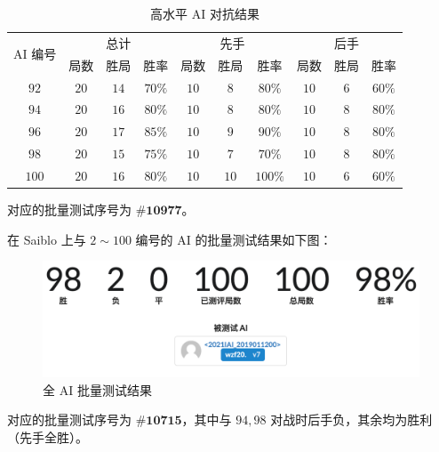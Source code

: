 \documentclass[a4paper]{article}
\begin{document}
    \begin{table}[H]
        \centering
        \begin{tabular}{cccccccccc}
            \toprule
            \multirow{2}{*}{AI 编号} & \multicolumn{3}{c}{总计} & \multicolumn{3}{c}{先手} & \multicolumn{3}{c}{后手} \\
            & \multicolumn{1}{c}{局数} & \multicolumn{1}{c}{胜局} & \multicolumn{1}{c}{胜率} & \multicolumn{1}{c}{局数} & \multicolumn{1}{c}{胜局} & \multicolumn{1}{c}{胜率} & \multicolumn{1}{c}{局数} & \multicolumn{1}{c}{胜局} & \multicolumn{1}{c}{胜率} \\ \cline{1-10}
            $92$ & $20$ & $14$ & $70\%$ & $10$ & $8$ & $80\%$ & $10$ & $6$ & $60\%$ \\ \cline{1-10}
            $94$ & $20$ & $16$ & $80\%$ & $10$ & $8$ & $80\%$ & $10$ & $8$ & $80\%$ \\ \cline{1-10}
            $96$ & $20$ & $17$ & $85\%$ & $10$ & $9$ & $90\%$ & $10$ & $8$ & $80\%$ \\ \cline{1-10}
            $98$ & $20$ & $15$ & $75\%$ & $10$ & $7$ & $70\%$ & $10$ & $8$ & $80\%$ \\ \cline{1-10}
            $100$ & $20$ & $16$ & $80\%$ & $10$ & $10$ & $100\%$ & $10$ & $6$ & $60\%$ \\
            \bottomrule
        \end{tabular}
        \caption{高水平 AI 对抗结果}
	    \label{tab1}
    \end{table}

    对应的批量测试序号为 $\pmb{\#10977}$。

    在 Saiblo 上与 $2 \sim 100$ 编号的 AI 的批量测试结果如下图：

    \begin{figure}[h]
        \centering
        \includegraphics[width=1\textwidth]{1}
        \caption{全 AI 批量测试结果}
        \label{fig1}
    \end{figure}

    对应的批量测试序号为 $\pmb{\#10715}$，其中与 $94, 98$ 对战时后手负，其余均为胜利（先手全胜）。
\end{document}

